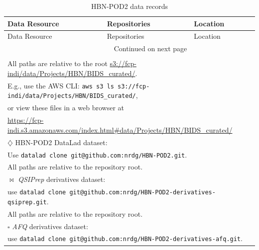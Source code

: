 \documentclass[fleqn,10pt,inline]{wlscirep}
\begin{document}
\begin{longtable}{p{4.0cm}p{2.9cm}p{9.3cm}}
\caption{HBN-POD2 data records} \label{tab:data-records} \\
\toprule
    Data Resource & Repositories & Location \\
\midrule
\endfirsthead

\toprule
    Data Resource & Repositories & Location \\
\midrule
\endhead
\midrule
\multicolumn{2}{r}{{Continued on next page}} \\
\midrule
\endfoot

\hline
\hline
\multicolumn{3}{l}{{$\dagger$ FCP-INDI:}} \\
\multicolumn{3}{l}{{\hspace{2em}All paths are relative to the root \url{s3://fcp-indi/data/Projects/HBN/BIDS_curated/}.}} \\
\multicolumn{3}{l}{{\hspace{2em}E.g., use the AWS CLI: \texttt{aws s3 ls s3://fcp-indi/data/Projects/HBN/BIDS\_curated/},}} \\
\multicolumn{3}{l}{{\hspace{2em}or view these files in a web browser at}} \\
\multicolumn{3}{l}{{\hspace{2em}\url{https://fcp-indi.s3.amazonaws.com/index.html\#data/Projects/HBN/BIDS\_curated/}}} \\
%
\multicolumn{3}{l}{{$\diamondsuit$ HBN-POD2 DataLad dataset\cite{hbnpod2data}:}} \\
\multicolumn{3}{l}{{\hspace{2em}Use \texttt{datalad clone git@github.com:nrdg/HBN-POD2.git}.}} \\
\multicolumn{3}{l}{{\hspace{2em}All paths are relative to the repository root.}} \\
%
\multicolumn{3}{l}{{$\Join$ \emph{QSIPrep} derivatives dataset\cite{hbnpod2qsiprepdata}:}} \\
\multicolumn{3}{l}{{\hspace{2em}use \texttt{datalad clone git@github.com:nrdg/HBN-POD2-derivatives-qsiprep.git}.}} \\
\multicolumn{3}{l}{{\hspace{2em}All paths are relative to the repository root.}} \\
%
\multicolumn{3}{l}{{$\square$ \emph{AFQ} derivatives dataset\cite{hbnpod2afqdata}:}} \\
\multicolumn{3}{l}{{\hspace{2em}use \texttt{datalad clone git@github.com:nrdg/HBN-POD2-derivatives-afq.git}.}} \\

\end{longtable}
\end{document}
